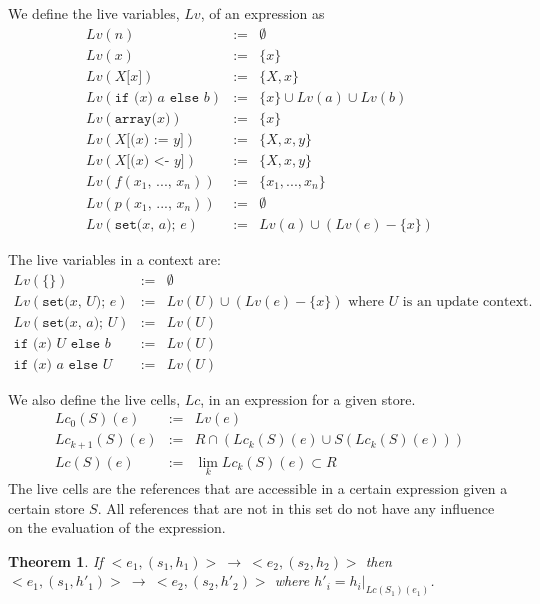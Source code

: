 \documentclass[12pt,a4paper]{article}
\newcommand{\cl}[1]{\texttt{#1}}
\newtheorem{theorem}{Theorem}
\newcommand{\ucont}[1]{\{#1\}}
\begin{document}
We define the live variables, $Lv$, of an expression as
\begin{eqnarray*}
Lv( n ) & := & \emptyset \\
Lv( x ) & := & \{ x \} \\
Lv( X\cl{[}x\cl{]} ) & := & \{ X, x \} \\
Lv( \cl{if (} x \cl{) } a \cl{ else } b) & := & \{ x \} \cup Lv(a) \cup Lv(b) \\
Lv( \cl{array(} x \cl{)} ) & := & \{ x \} \\
Lv( X \cl{[(} x \cl{) := } y \cl{]} ) & := & \{ X, x, y \} \\
Lv( X \cl{[(} x \cl{) <- } y \cl{]} ) & := & \{ X, x, y \} \\
Lv( f(x_1 \cl{, } ... \cl{, } x_n) ) & := & \{ x_1, ... , x_n \} \\
Lv( p(x_1 \cl{, } ... \cl{, } x_n) ) & := & \emptyset \\
Lv( \cl{set(} x \cl{, } a \cl{); } e ) &:=& Lv(a) \cup \left( Lv(e) - \{ x \} \right)
\end{eqnarray*}

The live variables in a context are:
\begin{eqnarray*}
Lv(\ucont{} ) &:=& \emptyset \\
Lv( \cl{set(} x \cl{, } U \cl{); } e ) &:=& Lv(U) \cup \left(Lv(e) - \{ x \} \right) \text{ where $U$ is an update context.} \\
Lv( \cl{set(} x \cl{, } a \cl{); } U ) &:=& Lv(U) \\
\cl{if (} x \cl{) } U \cl{ else } b &:=& Lv(U) \\
\cl{if (} x \cl{) } a \cl{ else } U &:=& Lv(U) 
\end{eqnarray*}


We also define the live cells, $Lc$, in an expression for a given store.
\begin{eqnarray*}
Lc_0(S)(e) &:=& Lv(e) \\
Lc_{k+1}(S)(e) &:=& R \cap (Lc_k(S)(e) \cup S( Lc_k(S)(e) ) ) \\
Lc(S)(e) &:=& \lim_k Lc_k(S)(e) \subset R
\end{eqnarray*}
The live cells are the references that are accessible in a certain expression given a certain store $S$. All references that are not in this set do not have any influence on the evaluation of the expression.

\begin{theorem}
If $<e_1, (s_1, h_1)> \ \longrightarrow \ <e_2, (s_2, h_2)>$ then $<e_1, (s_1, h'_1)> \ \longrightarrow \ <e_2, (s_2, h'_2)>$ where $h'_i = h_i|_{Lc(S_1)(e_1)}$.
\end{theorem}
\end{document}
